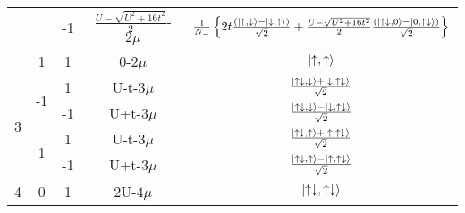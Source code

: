 \documentclass[12pt]{article}
\begin{document}
\begin{center}
\begin{tabular}{@{}ccccc@{}}
                                       &                     & -1 & \(\frac{U-\sqrt{U^2+16 t^2}}{2}\)-\(2\mu\)    & \(\frac{1}{N_-}\left\{{2t \frac{(\ket{\uparrow,\downarrow}-\ket{\downarrow,\uparrow})}{\sqrt{2}} + \frac{U-\sqrt{U^2+16 t^2}}{2} \frac{(\ket{\uparrow\downarrow,0}-\ket{0,\uparrow\downarrow})}{\sqrt{2}}}\right\}\)  \\ \cmidrule(l){2-5} 
                                       & 1                   & 1  & 0-\(2\mu\)   & \(\ket{\uparrow,\uparrow}\) \\ \toprule
\multirow{4}{*}{3}                     & \multirow{2}{*}{-1} & 1  & U-t-\(3\mu\) & \(\frac{\ket{\uparrow\downarrow,\downarrow}+\ket{\downarrow,\uparrow\downarrow}}{\sqrt{2}}\) \\ \cmidrule(l){3-5} 
                                       &                     & -1 & U+t-\(3\mu\) & \(\frac{\ket{\uparrow\downarrow,\downarrow}-\ket{\downarrow,\uparrow\downarrow}}{\sqrt{2}}\) \\ \cmidrule(l){2-5}
                                       & \multirow{2}{*}{1}  & 1  & U-t-\(3\mu\) & \(\frac{\ket{\uparrow\downarrow,\uparrow}+\ket{\uparrow,\uparrow\downarrow}}{\sqrt{2}}\) \\ \cmidrule(l){3-5} 
                                       &                     & -1 & U+t-\(3\mu\) & \(\frac{\ket{\uparrow\downarrow,\uparrow}-\ket{\uparrow,\uparrow\downarrow}}{\sqrt{2}}\) \\ \toprule
4                                      & 0                   & 1  & 2U-\(4\mu\)  & \(\ket{\uparrow\downarrow,\uparrow\downarrow}\) \\
\toprule
\end{tabular}
\end{center}
\end{document}
